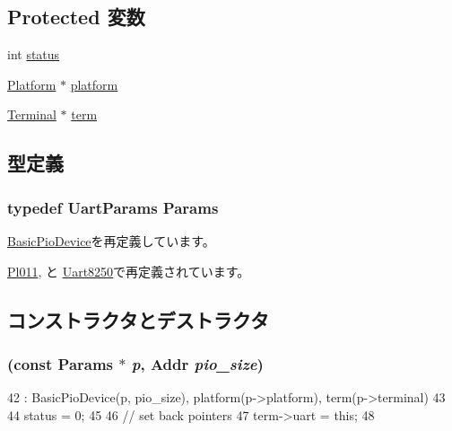 \subsection*{Protected 変数}
\begin{DoxyCompactItemize}
\item 
int \hyperlink{classUart_a6e27f49150e9a14580fb313cc2777e00}{status}
\item 
\hyperlink{classPlatform}{Platform} $\ast$ \hyperlink{classUart_a75b48f1787959a4617f2a599d7c09aab}{platform}
\item 
\hyperlink{classTerminal}{Terminal} $\ast$ \hyperlink{classUart_a61b35a33209eb5f0de1f6f97f543ef92}{term}
\end{DoxyCompactItemize}


\subsection{型定義}
\hypertarget{classUart_a20a580db9778bd0604704c3c6baabfa6}{
\subsubsection[{Params}]{\setlength{\rightskip}{0pt plus 5cm}typedef UartParams {\bf Params}}}
\label{classUart_a20a580db9778bd0604704c3c6baabfa6}


\hyperlink{classBasicPioDevice_a2845515ac6467f10540747053c8a0449}{BasicPioDevice}を再定義しています。

\hyperlink{classPl011_a7c50120eadc91b7f8522e0e4f1398769}{Pl011}, と \hyperlink{classUart8250_aa413e69885bd7a520ee8b988aa3e1c8b}{Uart8250}で再定義されています。

\subsection{コンストラクタとデストラクタ}
\hypertarget{classUart_a8976dbcdc99368c9aa2e9aed71bd49da}{
\subsubsection[{Uart}]{ (const {\bf Params} $\ast$ {\em p}, \/  {\bf Addr} {\em pio\_\-size})}}
\label{classUart_a8976dbcdc99368c9aa2e9aed71bd49da}



\begin{DoxyCode}
42     : BasicPioDevice(p, pio_size), platform(p->platform), term(p->terminal)
43 {
44     status = 0;
45 
46     // set back pointers
47     term->uart = this;
48 }
\end{DoxyCode}


